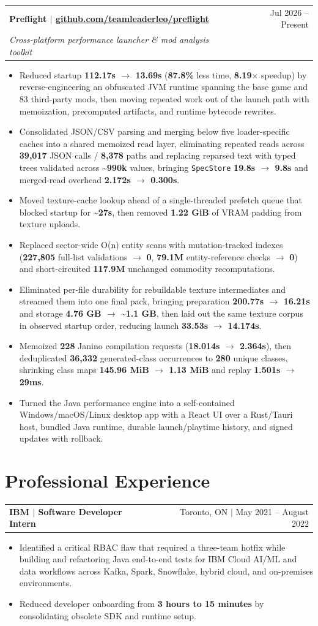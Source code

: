 \documentclass[letterpaper,11pt]{article}
\makeatletter
\newcommand{\resumeHeading}[4]{%
  \begin{tabularx}{\textwidth}{@{}Xr@{}}
    \textbf{#1} & #2 \\
    \textit{\small #3} & \textit{\small #4}
  \end{tabularx}\vspace{-2pt}
}
\newcommand{\resumeHeadingSimple}[2]{%
  \begin{tabularx}{\textwidth}{@{}Xr@{}}
    \textbf{#1} & #2
  \end{tabularx}\vspace{-0.25pt}
}
\newcommand{\resumeItemListStart}{\begin{itemize}[leftmargin=0.23in,itemsep=1.2pt,parsep=0pt,topsep=1.0pt]}
\newcommand{\resumeItem}[1]{\item\fontsize{10.6pt}{12.2pt}\selectfont #1}
\newcommand{\resumeItemListEnd}{\end{itemize}\vspace{-0.25pt}}
\makeatother
\begin{document}
\resumeHeading
  {Preflight $|$ \href{https://github.com/teamleaderleo/preflight}{github.com/teamleaderleo/preflight}}
  {Jul 2026 -- Present}
  {\normalfont Cross-platform performance launcher \& mod analysis toolkit}
  {}
\resumeItemListStart
  \resumeItem{Reduced startup \textbf{112.17s $\rightarrow$ 13.69s} (\textbf{87.8\%} less time, \textbf{8.19$\times$} speedup) by reverse-engineering an obfuscated JVM runtime spanning the base game and 83 third-party mods, then moving repeated work out of the launch path with memoization, precomputed artifacts, and runtime bytecode rewrites.}
  \resumeItem{Consolidated JSON/CSV parsing and merging below five loader-specific caches into a shared memoized read layer, eliminating repeated reads across \textbf{39,017} JSON calls / \textbf{8,378} paths and replacing reparsed text with typed trees validated across \textbf{\textasciitilde990k} values, bringing \texttt{SpecStore} \textbf{19.8s $\rightarrow$ 9.8s} and merged-read overhead \textbf{2.172s $\rightarrow$ 0.300s}.}
  \resumeItem{Moved texture-cache lookup ahead of a single-threaded prefetch queue that blocked startup for \textbf{\textasciitilde27s}, then removed \textbf{1.22 GiB} of VRAM padding from texture uploads.}
  \resumeItem{Replaced sector-wide O(n) entity scans with mutation-tracked indexes (\textbf{227,805} full-list validations $\rightarrow$ \textbf{0}, \textbf{79.1M} entity-reference checks $\rightarrow$ \textbf{0}) and short-circuited \textbf{117.9M} unchanged commodity recomputations.}
  \resumeItem{Eliminated per-file durability for rebuildable texture intermediates and streamed them into one final pack, bringing preparation \textbf{200.77s $\rightarrow$ 16.21s} and storage \textbf{4.76 GB $\rightarrow$ \textasciitilde1.1 GB}, then laid out the same texture corpus in observed startup order, reducing launch \textbf{33.53s $\rightarrow$ 14.174s}.}
  \resumeItem{Memoized \textbf{228} Janino compilation requests (\textbf{18.014s $\rightarrow$ 2.364s}), then deduplicated \textbf{36,332} generated-class occurrences to \textbf{280} unique classes, shrinking class maps \textbf{145.96 MiB $\rightarrow$ 1.13 MiB} and replay \textbf{1.501s $\rightarrow$ 29ms}.}
  \resumeItem{Turned the Java performance engine into a self-contained Windows/macOS/Linux desktop app with a React UI over a Rust/Tauri host, bundled Java runtime, durable launch/playtime history, and signed updates with rollback.}
\resumeItemListEnd

\section{Professional Experience}
\resumeHeadingSimple
  {IBM $|$ Software Developer Intern}
  {Toronto, ON $|$ May 2021 -- August 2022}
\resumeItemListStart
  \resumeItem{Identified a critical RBAC flaw that required a three-team hotfix while building and refactoring Java end-to-end tests for IBM Cloud AI/ML and data workflows across Kafka, Spark, Snowflake, hybrid cloud, and on-premises environments.}
  \resumeItem{Reduced developer onboarding from \textbf{3 hours to 15 minutes} by consolidating obsolete SDK and runtime setup.}
\resumeItemListEnd
\end{document}

